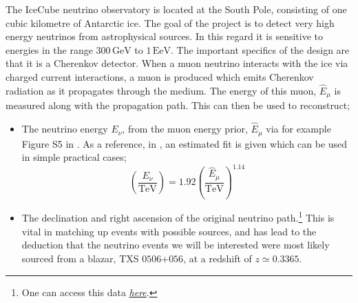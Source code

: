 The IceCube neutrino observatory \cite{IceCube} is located at the South Pole, consisting of one cubic kilometre of Antarctic ice. The goal of the project is to detect very high energy neutrinos from astrophysical sources. In this regard it is sensitive to energies in the range $300\,\text{GeV}$ to $1\,\text{EeV}$. The important specifics of the design are that it is a Cherenkov detector. When a muon neutrino interacts with the ice via charged current interactions, a muon is produced which emits Cherenkov radiation as it propagates through the medium. The energy of this muon, $\hat{E}_\mu$ is measured along with the propagation path. This can then be used to reconstruct;
\begin{itemize}
  \item The neutrino energy $E_\nu$, from the muon energy prior, $\hat{E}_\mu$ via for example Figure S5 in \cite{IceCube2018}. As a reference, in \cite{Kelly}, an estimated fit is given which can be used in simple practical cases;
  \begin{equation}
    \left(\frac{E_\nu}{\textrm{TeV}}\right) = 1.92\left(\frac{\hat{E}_\mu}{\textrm{TeV}}\right)^{1.14}
  \end{equation}
  \item The declination and right ascension of the original neutrino path.\footnote{One can access this data \href{https://icecube.wisc.edu/science/data/access}{\textit{here}}.} This is vital in matching up events with possible sources, and has lead to the deduction that the neutrino events we will be interested were most likely sourced from a blazar, TXS $0506$+$056$, at a redshift of $z \simeq 0.3365$.
\end{itemize}

